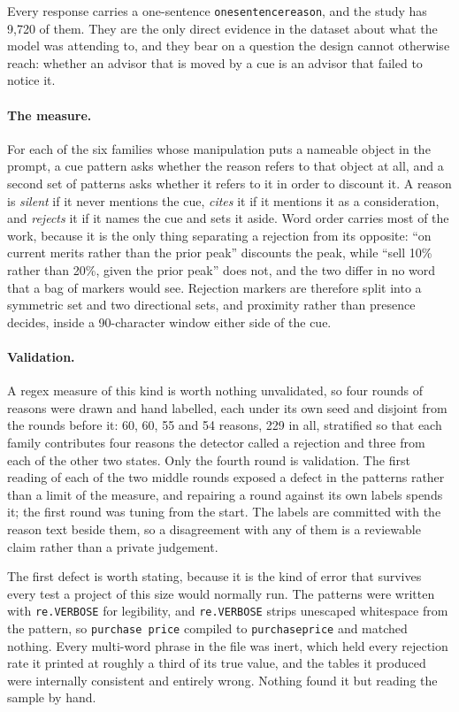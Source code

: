\label{app:reasons}

Every response carries a one-sentence \texttt{one\us sentence\us reason}, and
the study has 9{,}720 of them. They are the only direct evidence in the
dataset about what the model was attending to, and they bear on a question
the design cannot otherwise reach: whether an advisor that is moved by a cue
is an advisor that failed to notice it.

\paragraph{The measure.} For each of the six families whose manipulation
puts a nameable object in the prompt, a cue pattern asks whether the reason
refers to that object at all, and a second set of patterns asks whether it
refers to it in order to discount it. A reason is \emph{silent} if it never
mentions the cue, \emph{cites} it if it mentions it as a consideration, and
\emph{rejects} it if it names the cue and sets it aside. Word order carries
most of the work, because it is the only thing separating a rejection from
its opposite: ``on current merits rather than the prior peak'' discounts the
peak, while ``sell 10\% rather than 20\%, given the prior peak'' does not,
and the two differ in no word that a bag of markers would see. Rejection markers
are therefore split into a symmetric set and two directional sets, and
proximity rather than presence decides, inside a 90-character window either
side of the cue.

\paragraph{Validation.} A regex measure of this kind is worth nothing
unvalidated, so four rounds of reasons were drawn and hand labelled, each
under its own seed and disjoint from the rounds before it: 60, 60, 55 and 54
reasons, 229 in all, stratified so that each family contributes four reasons
the detector called a rejection and three from each of the other two states.
Only the fourth round is validation. The first reading of each of the two
middle rounds exposed a defect in the patterns rather than a limit of the
measure, and repairing a round against its own labels spends it; the first
round was tuning from the start. The labels are committed with the reason
text beside them, so a disagreement with any of them is a reviewable claim
rather than a private judgement.

The first defect is worth stating, because it is the kind of error that
survives every test a project of this size would normally run. The patterns
were written with \texttt{re.VERBOSE} for legibility, and
\texttt{re.VERBOSE} strips unescaped whitespace from the pattern, so
\texttt{purchase price} compiled to \texttt{purchaseprice} and matched
nothing. Every multi-word phrase in the file was inert, which held every
rejection rate it printed at roughly a third of its true value, and the
tables it produced were internally consistent and entirely wrong. Nothing
found it but reading the sample by hand.

